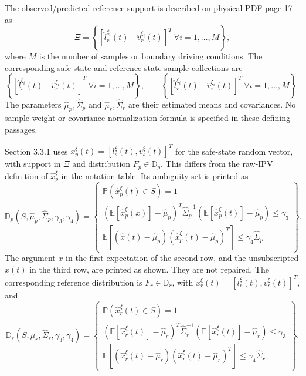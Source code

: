 \documentclass[10pt]{article}
\begin{document}
The observed/predicted reference support is described on physical PDF page 17 as
\[
\Xi=\left\{[\hat l_r^{\xi_i}(t)\quad\hat v_r^{\xi_i}(t)]^T\ \forall i=1,\ldots,M\right\},
\]
where \(M\) is the number of samples or boundary driving conditions. The corresponding safe-state and reference-state sample collections are
\[
\left\{[\hat l_s^{\xi_i}(t)\quad\hat v_s^{\xi_i}(t)]^T\ \forall i=1,\ldots,M\right\},\qquad
\left\{[\hat l_r^{\xi_i}(t)\quad\hat v_r^{\xi_i}(t)]^T\ \forall i=1,\ldots,M\right\}.
\]
The parameters \(\hat\mu_p,\hat\Sigma_p\) and \(\hat\mu_r,\hat\Sigma_r\) are their estimated means and covariances. No sample-weight or covariance-normalization formula is specified in these defining passages.

Section 3.3.1 uses \(x_p^\xi(t)=[l_s^\xi(t),v_s^\xi(t)]^T\) for the safe-state random vector, with support in \(\Xi\) and distribution \(F_p\in\mathbb D_p\). This differs from the raw-IPV definition of \(\hat x_p^\xi\) in the notation table. Its ambiguity set is printed as
\begin{equation}
\mathbb D_p(S,\hat\mu_p,\hat\Sigma_p,\gamma_3,\gamma_4)=
\left\{\begin{array}{l}
\mathbb P(\hat x_p^\xi(t)\in S)=1\\
(\mathbb E[\hat x_p^\xi(x)]-\hat\mu_p)^T\hat\Sigma_p^{-1}
(\mathbb E[\hat x_p^\xi(t)]-\hat\mu_p)\leq\gamma_3\\
\mathbb E[(\hat x(t)-\hat\mu_p)(\hat x_p^\xi(t)-\hat\mu_p)^T]\leq\gamma_4\hat\Sigma_p
\end{array}\right\}.
\tag{21}
\end{equation}
The argument \(x\) in the first expectation of the second row, and the unsubscripted \(\hat x(t)\) in the third row, are printed as shown. They are not repaired. The corresponding reference distribution is \(F_r\in\mathbb D_r\), with \(x_r^\xi(t)=[l_r^\xi(t),v_r^\xi(t)]^T\), and
\begin{equation}
\mathbb D_r(S,\hat\mu_r,\hat\Sigma_r,\gamma_3,\gamma_4)=
\left\{\begin{array}{l}
\mathbb P(\hat x_r^\xi(t)\in S)=1\\
(\mathbb E[\hat x_r^\xi(t)]-\hat\mu_r)^T\hat\Sigma_r^{-1}
(\mathbb E[\hat x_r^\xi(t)]-\hat\mu_r)\leq\gamma_3\\
\mathbb E[(\hat x_r^\xi(t)-\hat\mu_r)(\hat x_r^\xi(t)-\hat\mu_r)^T]\leq\gamma_4\hat\Sigma_r
\end{array}\right\}.
\tag{22}
\end{equation}
\end{document}
